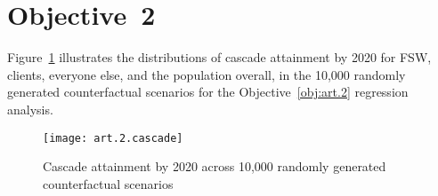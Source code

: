 \section{Objective~2}\label{app.art.2}
Figure~\ref{fig:art.2.cascade} illustrates the distributions of cascade attainment by 2020
for FSW, clients, everyone else, and the population overall,
in the 10,000 randomly generated counterfactual scenarios
for the Objective~\ref{obj:art.2} regression analysis.
\begin{figure}[h]
  \centering
  \texttt{[image: art.2.cascade]}
  \caption{Cascade attainment by 2020 across 10,000 randomly generated counterfactual scenarios}
  \label{fig:art.2.cascade}
\end{figure}
\printchapterbibliography
